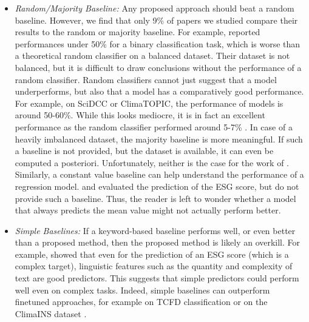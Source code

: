 \begin{itemize}
    \item \textit{Random/Majority Baseline:} Any proposed approach should beat a random baseline. However, we find that only 9\% of papers we studied compare their results to the random or majority baseline. For example, \citet{Friederich_climate_risk_disclosure} reported performances under 50\% for a binary classification task, which is worse than a theoretical random classifier on a balanced dataset. Their dataset is not balanced, but it is difficult to draw conclusions without the performance of a random classifier. 
    Random classifiers cannot just suggest that a model underperforms, but also that a model has a comparatively good performance. For example, on SciDCC or ClimaTOPIC, the performance of models is around 50-60\%. While this looks mediocre, it is in fact an excellent performance as the random classifier performed around 5-7\% \cite{spokoyny2023answering}. In case of a heavily imbalanced dataset, the majority baseline is more meaningful. If such a baseline is not provided, but the dataset is available, it can even be computed a posteriori. 
    Unfortunately, neither is the case for the work of \citet{Friederich_climate_risk_disclosure}. Similarly, a constant value baseline can help understand the performance of a regression model. \citet{Greenscreen} and \citet{bronzini_glitter_2023} evaluated the prediction of the ESG score, but do not provide such a baseline. Thus, the reader is left to wonder whether %
    a model that always predicts the mean value might not actually perform better. 
    \item \textit{Simple Baselines:} If a keyword-based baseline performs well, or even better than a proposed method, then the proposed method is likely an overkill. For example,
    \citet{rouenEvolutionESGReports2023, clarkson_nlp_us_csr} showed that even for the prediction of an ESG score (which is a complex target), linguistic features such as the quantity and complexity of text are good predictors. This suggests that simple predictors could perform well even on complex tasks. Indeed, simple baselines can outperform finetuned approaches, for example on TCFD classification \cite{sampson_tcfd-nlp_nodate} or on the ClimaINS dataset \cite{spokoyny2023answering}.

\end{itemize}
